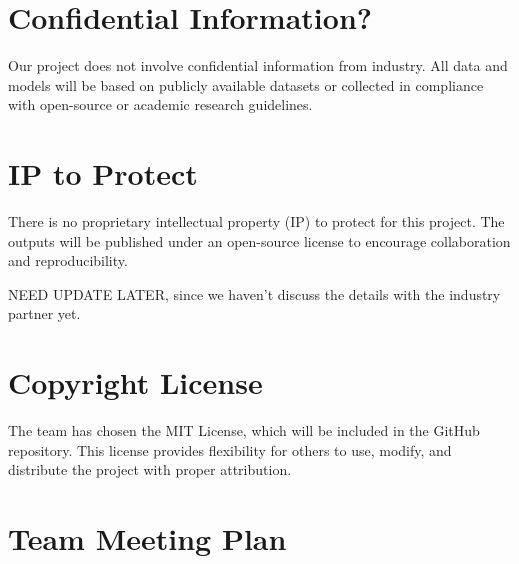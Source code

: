 \documentclass{article}
\begin{document}
\section{Confidential Information?}


Our project does not involve confidential information from industry. 
All data and models will be based on publicly available datasets or 
collected in compliance with open-source or academic research guidelines.

\section{IP to Protect}


There is no proprietary intellectual property (IP) to protect for this project. 
The outputs will be published under an open-source license to encourage 
collaboration and reproducibility.

NEED UPDATE LATER, since we haven't discuss the details with the industry partner yet.

\section{Copyright License}


The team has chosen the MIT License, which will be included in the GitHub 
repository. This license provides flexibility for others to use, modify, 
and distribute the project with proper attribution.


\section{Team Meeting Plan}


\end{document}
